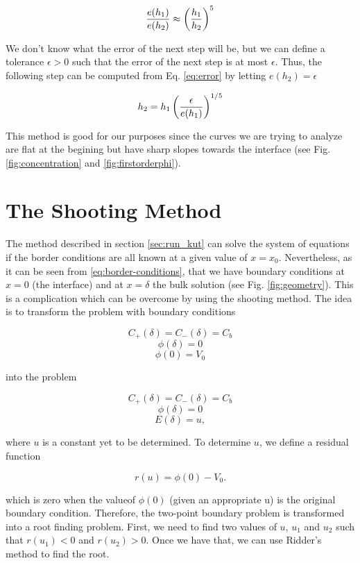 \begin{equation}
\frac{e(h_1)}{e(h_2)} \approx \left({\frac{h_1}{h_2}}\right)^5
\label{eq:error}
\end{equation}

We don't know what the error of the next step will be, but we can define a tolerance $\epsilon>0$ such that the error of the next step is at most $\epsilon$. Thus, the following step can be computed from Eq. \ref{eq:error} by letting $e(h_2) = \epsilon$

\begin{equation}
h_2= h_1\left({\frac{\epsilon}{e(h_1)}}\right)^{1/5}
\label{eq:error}
\end{equation}

This method is good for our purposes since the curves we are trying to analyze are flat at the begining but have sharp slopes towards the interface (see Fig. \ref{fig:concentration} and \ref{fig:firstorderphi}).

\section{The Shooting Method}

The method described in section \ref{sec:run_kut} can solve the system of equations if the border conditions are all known at a given value of $x = x_0$. Nevertheless, as it can be seen from \ref{eq:border-conditions},
that we have boundary conditions at $x=0$ (the interface) and at $x=\delta$ the bulk solution (see Fig. \ref{fig:geometry}). This is a complication which can be overcome by using the shooting method. The idea is to transform the problem with boundary conditions 

$$C_+(\delta) = C_-(\delta) = C_b$$
$$\phi(\delta) = 0$$
$$\phi(0) = V_0$$

into the problem


$$C_+(\delta) = C_-(\delta) = C_b$$
$$\phi(\delta) = 0$$
$$E(\delta) = u,$$

where $u$ is a constant yet to be determined. To determine $u$, we define a residual function

$$r(u) = \phi(0)-V_0.$$

which is zero when the valueof $\phi(0)$ (given an appropriate u) is the original boundary condition. Therefore, the two-point boundary problem is transformed into a  root finding problem. First, we need to find two values of $u$, $u_1$ and $u_2$ such that $r(u_1) < 0$ and  $r(u_2) > 0$. Once we have that, we can use Ridder's method to find the root.

